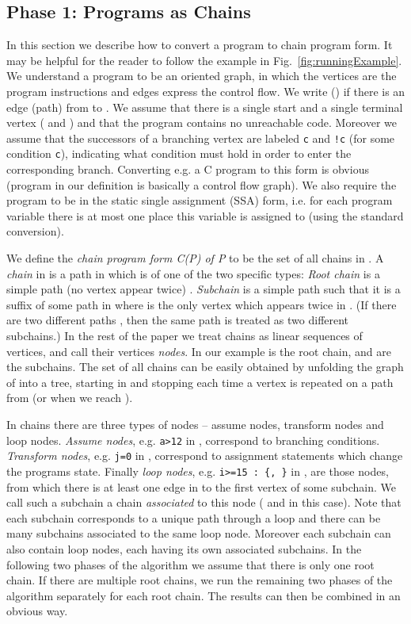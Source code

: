 \documentclass{llncs}
\begin{document}
\subsection{Phase 1: Programs as Chains}
\label{sec:AlgChains}

In this section we describe how to convert a program to chain program
form. It may be helpful for the reader to follow the example in
Fig.~\ref{fig:runningExample}.  We understand a program  to be an
oriented graph, in which the vertices are the program instructions and edges
express the control flow. We write  () if there is an edge
(path) from  to . We assume that there is a single start and a single
terminal vertex ( and ) and that the program  contains no
unreachable code. Moreover we assume that the successors of a branching
vertex are labeled \texttt{c} and \texttt{!c} (for some condition
\texttt{c}), indicating what condition must hold in order to enter the
corresponding branch.  Converting e.g. a C program to this form is obvious
(program in our definition is basically a control flow graph). We also
require the program to be in the static single assignment (SSA) form,
i.e. for each program variable there is at most one place this variable is assigned to
(using the standard conversion).

We define the \emph{chain program form C(P) of P} to be the set of all
chains in .  A \emph{chain} in  is a path in  which is of one of
the two specific types: \emph{Root chain} is a simple path (no vertex appear
twice) . \emph{Subchain} is a simple path  such
that it is a suffix of some path  
in  where  is the only vertex which appears
twice in .  (If there are two different paths , then the
same path  is treated as two different subchains.)
In the rest of the paper we treat chains as linear sequences of
vertices, and call their vertices \emph{nodes}.
In our example  is the root chain, and
 are the subchains.
The set of all chains can be easily obtained by unfolding the graph of  
into a tree, starting in  and stopping each time a vertex is repeated
on a path from  (or when we reach ).

 
In chains there are three types of nodes -- assume nodes, transform nodes and
loop nodes. \emph{Assume nodes}, e.g. \texttt{a>12} in , correspond to branching
conditions. \emph{Transform nodes}, e.g. \texttt{j=0} in ,
correspond to assignment statements which change the programs state. Finally
\emph{loop nodes}, e.g. \texttt{i>=15 : \{, \}} in , are those nodes, from
which there is at least one edge in  to the first vertex of some subchain. We call such a
subchain a chain \emph{associated} to this node ( and
 in this case). Note that
each subchain corresponds to a unique path through a loop and there can be
many subchains associated to the same loop node. Moreover each subchain can
also contain loop nodes, each having its own associated subchains. In
the following two phases of the algorithm we assume that there is only one
root chain. If there are multiple root chains, we run the remaining two
phases of the algorithm separately for each root chain. The results can then
be combined in an obvious way. 
\end{document}
